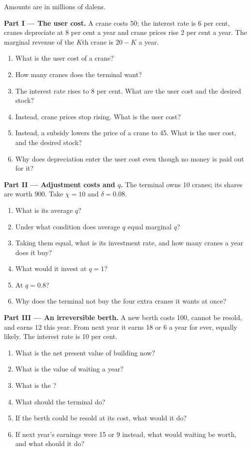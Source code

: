 \begin{problem}
\label{pb:b2:investment:1}
Amounts are in millions of dalens.

\medskip
\noindent\textbf{Part I --- The user cost.} A crane costs 50; the interest rate is 6 per cent, cranes depreciate at 8 per cent a
year and crane prices rise 2 per cent a year. The marginal revenue of the $K$th crane is $20 - K$ a year.
\begin{enumerate}
  \item What is the user cost of a crane?
  \item How many cranes does the terminal want?
  \item The interest rate rises to 8 per cent. What are the user cost and the desired stock?
  \item Instead, crane prices stop rising. What is the user cost?
  \item Instead, a subsidy lowers the price of a crane to 45. What is the user cost, and the desired stock?
  \item Why does depreciation enter the user cost even though no money is paid out for it?
\end{enumerate}

\medskip
\noindent\textbf{Part II --- Adjustment costs and $q$.} The terminal owns 10 cranes; its shares are worth 900. Take $\chi = 10$ and
$\delta = 0.08$.
\begin{enumerate}[resume]
  \item What is its average $q$?
  \item Under what condition does average $q$ equal marginal $q$?
  \item Taking them equal, what is its investment rate, and how many cranes a year does it buy?
  \item What would it invest at $q = 1$?
  \item At $q = 0.8$?
  \item Why does the terminal not buy the four extra cranes it wants at once?
\end{enumerate}

\medskip
\noindent\textbf{Part III --- An irreversible berth.} A new berth costs 100, cannot be resold, and earns 12 this year. From next
year it earns 18 or 6 a year for ever, equally likely. The interest rate is 10 per cent.
\begin{enumerate}[resume]
  \item What is the net present value of building now?
  \item What is the value of waiting a year?
  \item What is the ?
  \item What should the terminal do?
  \item If the berth could be resold at its cost, what would it do?
  \item If next year's earnings were 15 or 9 instead, what would waiting be worth, and what should it do?
\end{enumerate}


\end{problem}
